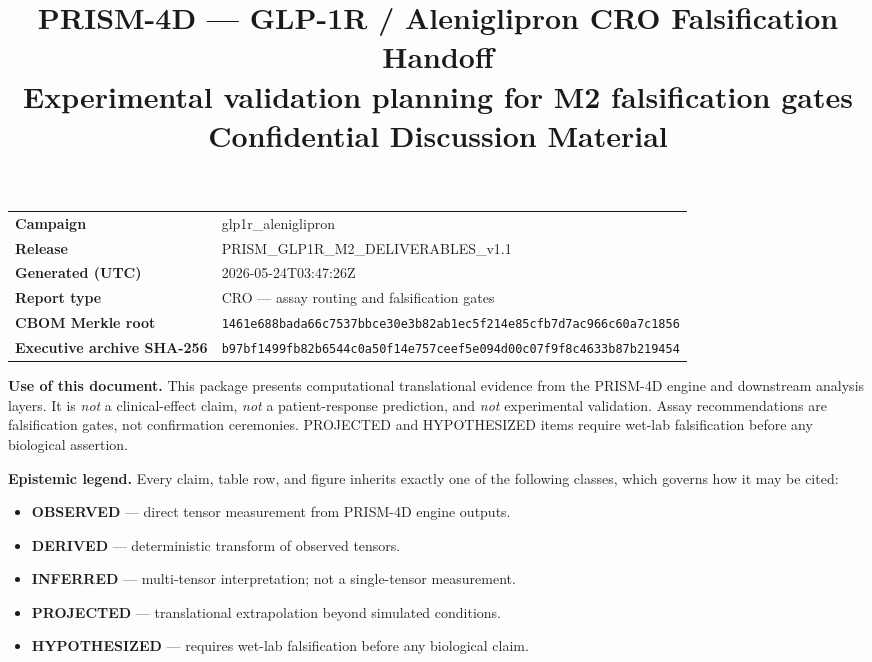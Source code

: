 \documentclass[11pt,a4paper]{article}
\title{
  \vspace{-12mm}
  {\color{DelfBlue}\textbf{\Large PRISM-4D — GLP-1R / Aleniglipron CRO Falsification Handoff}}\\[2pt]
  {\color{DelfGrey}\normalsize Experimental validation planning for M2 falsification gates}\\[6pt]
  {\color{DelfGrey}\small Confidential Discussion Material}
}
\author{}
\date{}
\newcommand{\epOBS}{\textcolor{EpObserved}{\textbf{OBSERVED}}}
\newcommand{\epDER}{\textcolor{EpDerived}{\textbf{DERIVED}}}
\newcommand{\epINF}{\textcolor{EpInferred}{\textbf{INFERRED}}}
\newcommand{\epPRJ}{\textcolor{EpProjected}{\textbf{PROJECTED}}}
\newcommand{\epHYP}{\textcolor{EpHypothesized}{\textbf{HYPOTHESIZED}}}
\begin{document}
\maketitle
\vspace{-14mm}

\begin{flushleft}
\small
\begin{tabular}{@{}p{}p{}@{}}
\textbf{Campaign}             & glp1r\_aleniglipron \\
\textbf{Release}              & PRISM\_GLP1R\_M2\_DELIVERABLES\_v1.1 \\
\textbf{Generated (UTC)}      & 2026-05-24T03:47:26Z \\
\textbf{Report type}          & CRO — assay routing and falsification gates \\
\textbf{CBOM Merkle root}     & \texttt{\small 1461e688bada66c7537bbce30e3b82ab1ec5f214e85cfb7d7ac966c60a7c1856} \\
\textbf{Executive archive SHA-256} & \texttt{\small b97bf1499fb82b6544c0a50f14e757ceef5e094d00c07f9f8c4633b87b219454} \\
\end{tabular}
\end{flushleft}

\vspace{4mm}

\begin{disclaimerbox}
\textbf{Use of this document.} This package presents computational
translational evidence from the PRISM-4D engine and downstream analysis
layers. It is \emph{not} a clinical-effect claim, \emph{not} a
patient-response prediction, and \emph{not} experimental validation.
Assay recommendations are falsification gates, not confirmation
ceremonies. PROJECTED and HYPOTHESIZED items require wet-lab
falsification before any biological assertion.
\end{disclaimerbox}

\begin{legendbox}
\textbf{Epistemic legend.} Every claim, table row, and figure inherits
exactly one of the following classes, which governs how it may be cited:
\begin{itemize}[leftmargin=18pt,topsep=2pt,itemsep=1pt]
  \item \epOBS{} — direct tensor measurement from PRISM-4D engine outputs.
  \item \epDER{} — deterministic transform of observed tensors.
  \item \epINF{} — multi-tensor interpretation; not a single-tensor measurement.
  \item \epPRJ{} — translational extrapolation beyond simulated conditions.
  \item \epHYP{} — requires wet-lab falsification before any biological claim.
\end{itemize}
\end{legendbox}
\end{document}
